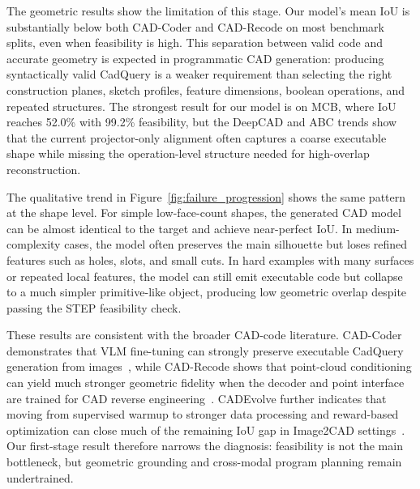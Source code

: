 \documentclass{article}
\begin{document}
The geometric results show the limitation of this stage. Our model's mean IoU is substantially below both CAD-Coder and CAD-Recode on most benchmark splits, even when feasibility is high. This separation between valid code and accurate geometry is expected in programmatic CAD generation: producing syntactically valid CadQuery is a weaker requirement than selecting the right construction planes, sketch profiles, feature dimensions, boolean operations, and repeated structures. The strongest result for our model is on MCB, where IoU reaches 52.0\% with 99.2\% feasibility, but the DeepCAD and ABC trends show that the current projector-only alignment often captures a coarse executable shape while missing the operation-level structure needed for high-overlap reconstruction.

The qualitative trend in Figure~\ref{fig:failure_progression} shows the same pattern at the shape level. For simple low-face-count shapes, the generated CAD model can be almost identical to the target and achieve near-perfect IoU. In medium-complexity cases, the model often preserves the main silhouette but loses refined features such as holes, slots, and small cuts. In hard examples with many surfaces or repeated local features, the model can still emit executable code but collapse to a much simpler primitive-like object, producing low geometric overlap despite passing the STEP feasibility check.

These results are consistent with the broader CAD-code literature. CAD-Coder demonstrates that VLM fine-tuning can strongly preserve executable CadQuery generation from images~\cite{cadcoder}, while CAD-Recode shows that point-cloud conditioning can yield much stronger geometric fidelity when the decoder and point interface are trained for CAD reverse engineering~\cite{cadrecode}. CADEvolve further indicates that moving from supervised warmup to stronger data processing and reward-based optimization can close much of the remaining IoU gap in Image2CAD settings~\cite{elistratov2026cadevolve}. Our first-stage result therefore narrows the diagnosis: feasibility is not the main bottleneck, but geometric grounding and cross-modal program planning remain undertrained.
\end{document}
